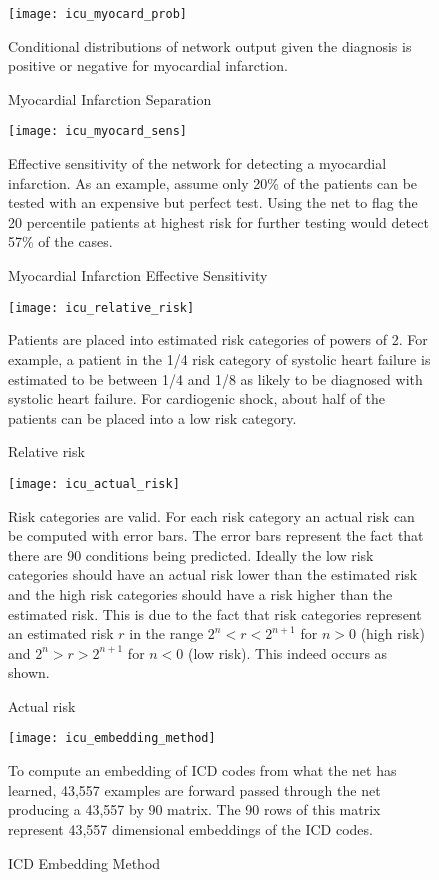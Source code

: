 \begin{figure}
\texttt{[image: icu\_myocard\_prob]}
\caption{Myocardial Infarction Separation}
\vspace{12px}
Conditional distributions of network output given the diagnosis is positive or negative for myocardial infarction.
\label{fig:icu_myocard_prob}
\end{figure}

\begin{figure}
\texttt{[image: icu\_myocard\_sens]}
\caption{Myocardial Infarction Effective Sensitivity}
\vspace{12px}
Effective sensitivity of the network for detecting a myocardial infarction.  As an example, assume only 20\% of the patients can be tested with an expensive but perfect test. Using the net to flag the 20 percentile patients at highest risk for further testing would detect 57\% of the cases.
\label{fig:icu_myocard_sens}
\end{figure}

\begin{figure}
\texttt{[image: icu\_relative\_risk]}
\caption{Relative risk}
\vspace{12px}
Patients are placed into estimated risk categories of powers of 2.  For example, a patient in the 1/4 risk category of systolic heart failure is estimated to be between 1/4 and 1/8 as likely to be diagnosed with systolic heart failure.  For cardiogenic shock, about half of the patients can be placed into a low risk category.
\label{fig:icu_relative_risk}
\end{figure}

\begin{figure}
\texttt{[image: icu\_actual\_risk]}
\caption{Actual risk}
\vspace{12px}
Risk categories are valid.  For each risk category an actual risk can be computed with error bars.  The error bars represent the fact that there are 90 conditions being predicted.  Ideally the low risk categories should have an actual risk lower than the estimated risk and the high risk categories should have a risk higher than the estimated risk.  This is due to the fact that risk categories represent an estimated risk $r$ in the range $2^n < r < 2^{n+1}$ for $n > 0$ (high risk) and $2^n > r > 2^{n+1}$ for $n < 0$ (low risk).  This indeed occurs as shown.
\label{fig:icu_actual_risk}
\end{figure}

\begin{figure}
\texttt{[image: icu\_embedding\_method]}
\caption{ICD Embedding Method}
\vspace{12px}
To compute an embedding of ICD codes from what the net has learned, 43,557 examples are forward passed through the net producing a 43,557 by 90 matrix.  The 90 rows of this matrix represent 43,557 dimensional embeddings of the ICD codes.
\label{fig:icu_embedding_method}
\end{figure}

